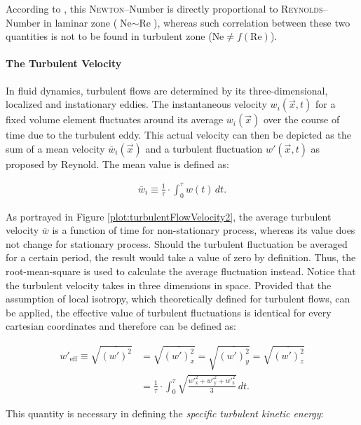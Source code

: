 According to \citet{Wollny2010Diss}, this \textsc{Newton}--Number is directly proportional to \textsc{Reynolds}--Number in laminar zone ($\text{Ne} \sim \text{Re}$), whereas such correlation between these two quantities is not to be found in turbulent zone ($\text{Ne} \neq f(\text{Re})$).

\paragraph{The Turbulent Velocity}
In fluid dynamics, turbulent flows are determined by its three-dimensional, localized and instationary eddies. The instantaneous velocity $w_i(\Vec{x},t)$ for a fixed volume element fluctuates around its average $\overline{w}_i(\Vec{x})$ over the course of time due to the turbulent eddy. This actual velocity can then be depicted as the sum of a mean velocity $\overline{w}_i(\Vec{x})$ and a turbulent fluctuation $w'(\Vec{x},t)$ as proposed by Reynold. The mean value is defined as:

\begin{gather}
    \overline{w}_i \equiv \frac{1}{\tau} \cdot \int_0^\tau w(t) \, dt.
\end{gather}

As portrayed in Figure \ref{plot:turbulentFlowVelocity2}, the average turbulent velocity $\overline{w}$ is a function of time for non-stationary process, whereas its value does not change for stationary process. Should the turbulent fluctuation be averaged for a certain period, the result would take a value of zero by definition. Thus, the root-mean-square is used to calculate the average fluctuation instead. Notice that the turbulent velocity takes in three dimensions in space. Provided that the assumption of local isotropy, which \citet{Kolmogorov} theoretically defined for turbulent flows, can be applied, the effective value of turbulent fluctuations is identical for every cartesian coordinates and therefore can be defined as:

\begin{align}
    {w'}_\text{eff} \equiv \sqrt{\overline{(w')^2}} &= \sqrt{\overline{(w')_x^2}} = \sqrt{\overline{(w')_y^2}} = \sqrt{\overline{(w')_z^2}} \nonumber \\
    &= \frac{1}{\tau} \cdot \int_0^\tau \sqrt{\frac{{w'}_\text{x}^2 + {w'}_\text{y}^2 + {w'}_\text{z}^2}{3}} \, dt.
\end{align}

This quantity is necessary in defining the \textit{specific turbulent kinetic energy}:


